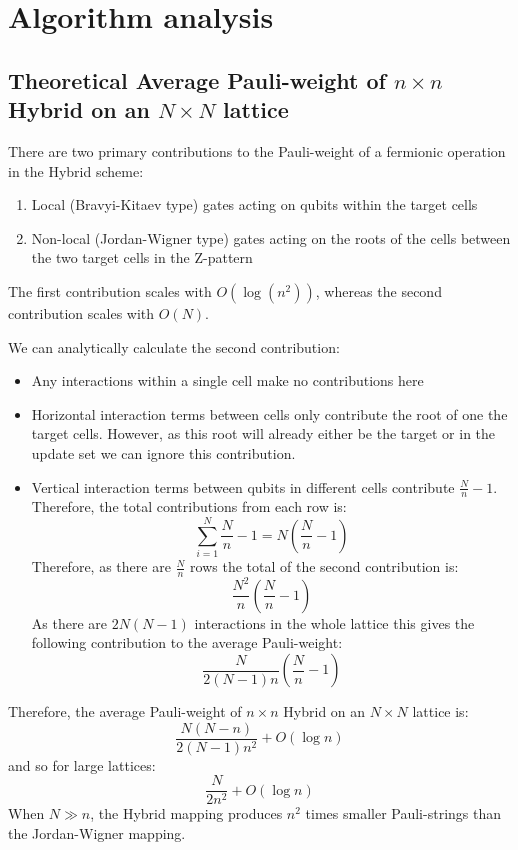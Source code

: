 \documentclass[pdftex,pra,aps,twocolumn,twoside]{revtex4-1}
\theoremstyle{plain}
\theoremstyle{note}
\newcommand\+{{\footnotesize \raisebox{0.3ex}{+}}}
\begin{document}
\section{Algorithm analysis}
\label{section:algorithmanalysis}
\subsection{Theoretical Average Pauli-weight of $n\times n$ Hybrid on an $N\times N$ lattice}
\label{section:hybridanalysis}
There are two primary contributions to the Pauli-weight of a fermionic operation in the Hybrid scheme:
\begin{enumerate}
    \item Local (Bravyi-Kitaev type) gates acting on qubits within the target cells
    \item Non-local (Jordan-Wigner type) gates acting on the roots of the cells between the two target cells in the Z-pattern
\end{enumerate}
The first contribution scales with $O(\log(n^2))$, whereas the second contribution scales with $O(N)$.

We can analytically calculate the second contribution:
\begin{itemize}
    \item Any interactions within a single cell make no contributions here
    \item Horizontal interaction terms between cells only contribute the root of one the target cells. However, as this root will already either be the target or in the update set we can ignore this contribution.
    \item Vertical interaction terms between qubits in different cells contribute $\frac{N}{n} -1$. Therefore, the total contributions from each row is:
    \begin{equation}
            \sum_{i=1}^{N} \frac{N}{n} -1 = N\left(\frac{N}{n} -1\right)
    \end{equation}
    Therefore, as there are $\frac{N}{n}$ rows the total of the second contribution is:
    \begin{equation}
        \frac{N^2}{n}\left(\frac{N}{n}-1\right)
    \end{equation}
    As there are $2N(N - 1)$ interactions in the whole lattice this gives the following contribution to the average Pauli-weight:
    \begin{equation}
        \frac{N}{2(N-1)n}\left(\frac{N}{n}-1\right)
    \end{equation}
\end{itemize}
Therefore, the average Pauli-weight of $n\times n$ Hybrid on an $N\times N$ lattice is:
\begin{equation}
        \frac{N(N-n)}{2(N-1)n^2} + O(\log n) 
\end{equation}
and so for large lattices:
\begin{equation}
        \frac{N}{2n^2} + O(\log n) 
\end{equation}
When $N\gg n$, the Hybrid mapping produces $n^2$ times smaller Pauli-strings than the Jordan-Wigner mapping.
\end{document}
